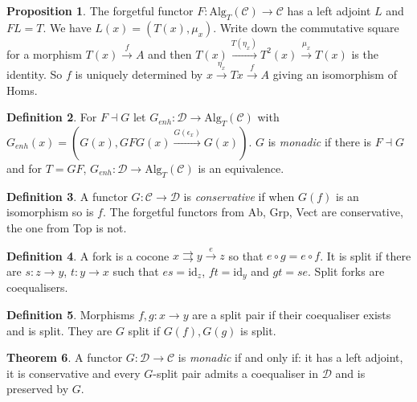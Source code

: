 \documentclass[a4paper,10pt]{article}
\theoremstyle{definition}
\newtheorem{theorem}{Theorem}
\newtheorem{definition}[theorem]{Definition}
\newtheorem{proposition}[theorem]{Proposition}
\newcommand{\C}{\mathcal{C}}
\newcommand{\D}{\mathcal{D}}
\newcommand{\id}{\mathrm{id}}
\begin{document}
\begin{proposition}
    The forgetful functor $F \colon \mathrm{Alg}_T(\C) \rightarrow \C$ has a left adjoint $L$ and $FL = T$.
    We have $L(x) = (T(x), \mu_x)$. Write down the commutative square for a morphism $T(x) \xrightarrow{f} A$ and then $T(x) \xrightarrow{T(\eta_x)} T^2(x) \xrightarrow{\mu_x} T(x)$ is the identity. So $f$ is uniquely determined by $x \xrightarrow{\eta_x} Tx \xrightarrow{f} A$ giving an isomorphism of Homs.
\end{proposition}

\begin{definition}
    For $F \dashv G$ let $G_{\mathit{enh}} \colon \D \rightarrow \mathrm{Alg}_T(\C)$ with $G_{\mathit{enh}}(x) = (G(x), GFG(x) \xrightarrow{G(\epsilon_x)} G(x))$. $G$ is \emph{monadic} if there is $F \dashv G$ and for $T = GF$, $G_\mathit{enh} \colon \D \rightarrow \mathrm{Alg}_T(\C)$ is an equivalence.
\end{definition}

\begin{definition}
    A functor $G \colon \C \rightarrow \D$ is \emph{conservative} if when $G(f)$ is an isomorphism so is $f$.
    The forgetful functors from Ab, Grp, Vect are conservative, the one from Top is not.
\end{definition}

\begin{definition}
    A fork is a cocone $x \rightrightarrows y  \xrightarrow{e} z $ so that $e \circ g = e \circ f$. It is split if there are $s \colon z \rightarrow y$, $t \colon y \rightarrow x$ such that $es = \id_z$, $ft = \id_y$ and $gt = se$.
    Split forks are coequalisers.
\end{definition}

\begin{definition}
    Morphisms $f, g \colon x \rightarrow y$ are a split pair if their coequaliser exists and is split. They are $G$ split if $G(f), G(g)$ is split.
\end{definition}

\begin{theorem}
    A functor $G \colon \D \rightarrow \C$ is \emph{monadic} if and only if: it has a left adjoint, it is conservative and every $G$-split pair admits a coequaliser in $\D$ and is preserved by $G$.
\end{theorem}
\end{document}
